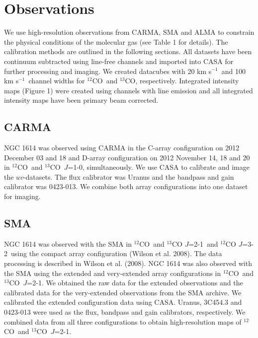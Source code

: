 \documentclass[preprint, 11pt]{aastex}
\newcommand{\tco}{$^{13}$CO}
\newcommand{\co}{$^{12}$CO}
\newcommand{\tcotwo}{$^{13}$CO $J$=2-1}
\newcommand{\cothree}{$^{12}$CO $J$=3-2}
\newcommand{\kms}{km s$^{-1}$}
\begin{document}
\section{Observations} %
We use high-resolution observations from CARMA, SMA and ALMA to constrain the physical conditions of the molecular gas (see Table 1 for details). The calibration methods are outlined in the following sections. All datasets have been continuum subtracted using line-free channels and imported into CASA for further processing and imaging. We created datacubes with 20 \kms\ and 100 \kms\ channel widths for \co\ and \tco, respectively. Integrated intensity maps (Figure 1) were created using channels with line emission and all integrated intensity maps have been primary beam corrected. 

\subsection{CARMA}
NGC 1614 was observed using CARMA in the C-array configuration on 2012 December 03 and 18 and D-array configuration on 2012 November 14, 18 and 20 in \co\ and \tco\ $J$=1-0, simultaneously. We use CASA to calibrate and image the $uv$-datasets. The flux calibrator was Uranus and the bandpass and gain calibrator was 0423-013. We combine both array configurations into one dataset for imaging. 

\subsection{SMA}

NGC 1614 was observed with the SMA in \co\ and \tcotwo\ and \cothree\ using the compact array configuration (Wilson et al. 2008). The data processing is described in Wilson et al. (2008). NGC 1614 was also observed with the SMA using the extended and very-extended \citep{Konig2013} array configurations in \co\ and \tco\ $J$=2-1. We obtained the raw data for the extended observations and the calibrated data for the very-extended observations from the SMA archive. We calibrated the extended configuration data using CASA. Uranus, 3C454.3 and 0423-013 were used as the flux, bandpass and gain calibrators, respectively. We combined data from all three configurations to obtain high-resolution maps of \co\ and \tco\ $J$=2-1.  
\end{document}
